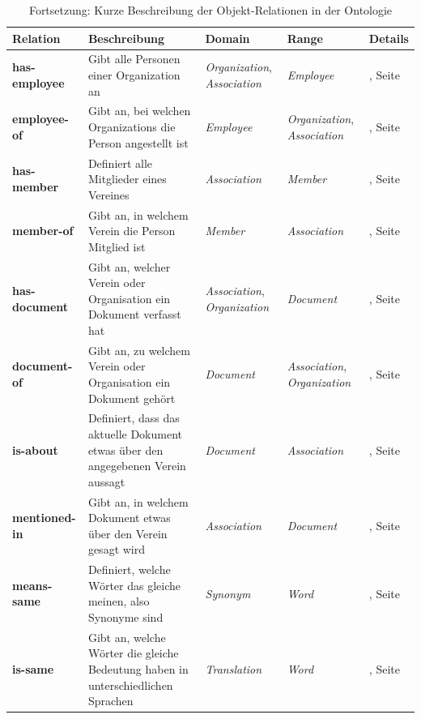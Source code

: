 \documentclass[
    11pt,
    latin1,
    a4paper,
    oneside
]{scrreprt}
\let\oldemph=\emph
\renewcommand{\emph}[1]{\index{#1}\oldemph{#1}}
\begin{document}
\begin{table}[H]
  \centering
  \begin{tabular}{ | l | p{4cm} | p{3cm} | p{2cm} | p{2cm} | }
    \hline
    \textbf{Relation} & \textbf{Beschreibung} & \textbf{Domain} & \textbf{Range} & \textbf{Details} \\ \hline
    \textbf{has-employee} & Gibt alle Personen einer Organization an & \emph{Organization}, \emph{Association} & \emph{Employee} & \nameref{sec:rel_hasemployee}, Seite \pageref{sec:rel_hasemployee} \\ \hline
    \textbf{employee-of} & Gibt an, bei welchen Organizations die Person angestellt ist & \emph{Employee} & \emph{Organization}, \emph{Association} & \nameref{sec:rel_employeeof}, Seite \pageref{sec:rel_employeeof} \\ \hline
    \textbf{has-member} & Definiert alle Mitglieder eines Vereines & \emph{Association} & \emph{Member} & \nameref{sec:rel_hasmember}, Seite \pageref{sec:rel_hasmember} \\ \hline
    \textbf{member-of} & Gibt an, in welchem Verein die Person Mitglied ist & \emph{Member} & \emph{Association} & \nameref{sec:rel_memberof}, Seite \pageref{sec:rel_memberof} \\ \hline
    \textbf{has-document} & Gibt an, welcher Verein oder Organisation ein Dokument verfasst hat & \emph{Association}, \emph{Organization} & \emph{Document} & \nameref{sec:rel_hasdocument}, Seite \pageref{sec:rel_hasdocument} \\ \hline
    \textbf{document-of} & Gibt an, zu welchem Verein oder Organisation ein Dokument geh\"ort & \emph{Document} & \emph{Association}, \emph{Organization} & \nameref{sec:rel_documentof}, Seite \pageref{sec:rel_documentof} \\ \hline
    \textbf{is-about} & Definiert, dass das aktuelle Dokument etwas \"uber den angegebenen Verein aussagt & \emph{Document} & \emph{Association} & \nameref{sec:rel_isabout}, Seite \pageref{sec:rel_isabout} \\ \hline
    \textbf{mentioned-in} & Gibt an, in welchem Dokument etwas \"uber den Verein gesagt wird & \emph{Association} & \emph{Document} & \nameref{sec:rel_mentionedin}, Seite \pageref{sec:rel_mentionedin} \\ \hline
    \textbf{means-same} & Definiert, welche W\"orter das gleiche meinen, also Synonyme sind & \emph{Synonym} & \emph{Word} & \nameref{sec:rel_meanssame}, Seite \pageref{sec:rel_meanssame} \\ \hline
    \textbf{is-same} & Gibt an, welche W\"orter die gleiche Bedeutung haben in unterschiedlichen Sprachen & \emph{Translation} & \emph{Word} & \nameref{sec:rel_issame}, Seite \pageref{sec:rel_issame} \\ \hline
  \end{tabular}
  \caption{Fortsetzung: Kurze Beschreibung der Objekt-Relationen in der Ontologie}
  \label{tbl:relations2}
\end{table}
\end{document}
